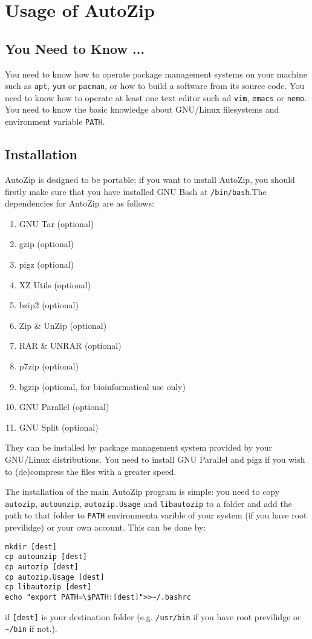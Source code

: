 \documentclass[journal,twocolumn]{IEEEtran}
\begin{document}
\section{Usage of AutoZip}
\subsection{You Need to Know ...}
You need to know how to operate package management systems on your machine such as \verb|apt|, \verb|yum| or \verb|pacman|, or how to build a software from its source code. You need to know how to operate at least one text editor such ad \verb|vim|, \verb|emacs| or \verb|nemo|. You need to know the basic knowledge about GNU/Linux filesystems and environment variable \verb|PATH|.
\subsection{Installation}
AutoZip is designed to be portable; if you want to install AutoZip, you should firstly make sure that you have installed GNU Bash at \verb|/bin/bash|.The dependencies for AutoZip are as follows:
\begin{enumerate}
\item GNU Tar (optional)
\item gzip (optional)
\item pigz (optional)
\item XZ Utils (optional)
\item bzip2 (optional)
\item Zip \& UnZip (optional)
\item RAR \& UNRAR (optional)
\item p7zip (optional)
\item bgzip (optional, for bioinformatical use only)
\item GNU Parallel (optional)
\item GNU Split (optional)
\end{enumerate}
They can be installed by package management system provided by your GNU/Linux distributions. You need to install GNU Parallel and pigz if you wish to (de)compress the files with a greater speed.\par
The installation of the main AutoZip program is simple: you need to copy \verb|autozip|, \verb|autounzip|, \verb|autozip.Usage| and \verb|libautozip| to a folder and add the path to that folder to \verb|PATH| environmenta varible of your system (if you have root previlidge) or your own account. This can be done by:
\begin{verbatim}
mkdir [dest]
cp autounzip [dest]
cp autozip [dest]
cp autozip.Usage [dest]
cp libautozip [dest]
echo "export PATH=\$PATH:[dest]">>~/.bashrc
\end{verbatim}
if \verb|[dest]| is your destination folder (e.g. \verb|/usr/bin| if you have root previlidge or \verb|~/bin| if not.).
\end{document}
